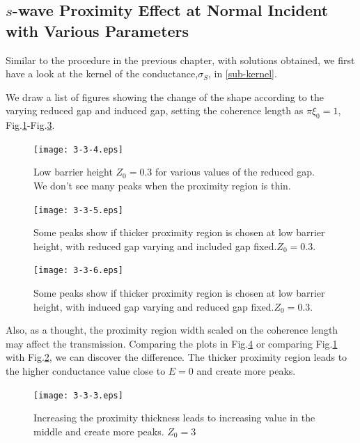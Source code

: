 \subsection{$s$-wave Proximity Effect at Normal Incident with Various Parameters}
Similar to the procedure in the previous chapter, with solutions obtained, we first have a look at the kernel of the conductance,$\sigma_S$, in \eqref{sub-kernel}.

We draw a list of figures showing the change of the shape according to the varying reduced gap and induced gap, setting the coherence length as $\pi\xi_0=1$, Fig.\ref{Z=0.3reducedthin}-Fig.\ref{Z=0.3induced}.
\begin{figure}[htbp]
\small
\centering
\texttt{[image: 3-3-4.eps]}
\caption{Low barrier height $Z_0=0.3$ for various values of the reduced gap. We don't see many peaks when the proximity region is thin.}
\label{Z=0.3reducedthin}
\end{figure} 
\begin{figure}[htbp]
\small
\centering
\texttt{[image: 3-3-5.eps]}
\caption{Some peaks show if thicker proximity region is chosen at low barrier height, with reduced gap varying and included gap fixed.$Z_0=0.3$.}
\label{Z=0.3reduced}
\end{figure}
\begin{figure}[htbp]
\small
\centering
\texttt{[image: 3-3-6.eps]}
\caption{Some peaks show if thicker proximity region is chosen at low barrier height, with induced gap varying and reduced gap fixed.$Z_0=0.3$.}
\label{Z=0.3induced}
\end{figure}

Also, as a thought, the proximity region width scaled on the coherence length may affect the transmission. Comparing the plots in Fig.\ref{fig:kernel x} or comparing Fig.\ref{Z=0.3reducedthin} with Fig.\ref{Z=0.3reduced}, we can discover the difference. The thicker proximity region leads to the higher conductance value close to $E=0$ and create more peaks.
\begin{figure}[htbp]
\small
\centering
\texttt{[image: 3-3-3.eps]}
\caption{Increasing the proximity thickness leads to increasing value in the middle and create more peaks. $Z_0=3$}
\label{fig:kernel x}
\end{figure}

